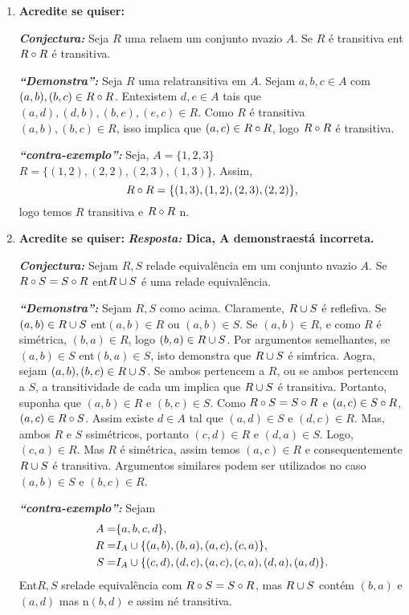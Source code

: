 \begin{enumerate}[{\bf 1.}]
\item {\bf Acredite se quiser:}  

\noindent \textit{\textbf{Conjectura:}} Seja $R$ uma rela\cao em um conjunto n\ao vazio $A$. Se $R$ \'e transitiva ent\ao $R\circ R$ \'e transitiva.

\noindent \textit{\textbf{``Demonstra\caoi'':}} Seja $R$ uma rela\cao transitiva em $A$. Sejam $a,b,c\in A$ com $(a,b),(b,c)\in R\circ R$. Ent\ao existem $d,e\in A$ tais que $(a,d),(d,b),(b,e),(e,c)\in R$. Como $R$ \'e transitiva $(a,b),(b,c)\in R$, isso implica que $(a,c)\in R\circ R$, logo $R\circ R$ \'e transitiva.

\noindent \textit{\textbf{``contra-exemplo'':}} Seja, $A=\{1,2,3\}$ $R=\{(1,2),(2,2),(2,3),(1,3)\}$. Assim,
\[
R\circ R=\{(1,3),(1,2),(2,3),(2,2)\},
\]
logo temos $R$ transitiva e $R\circ R$ n\aoi.

\item {\bf Acredite se quiser:} {\bf{\it Resposta:} Dica, A demonstra\cao est\'a incorreta.} 

\noindent \textit{\textbf{Conjectura:}} Sejam $R,S$ rela\coes de equival\^encia em um conjunto n\ao vazio $A$. Se $R\circ S=S\circ R$ ent\ao $R\cup S$ \'e uma rela\cao de equival\^encia.

\noindent \textit{\textbf{``Demonstra\caoi'':}} Sejam $R,S$ como acima. Claramente, $R\cup S$ \'e reflefiva. Se $(a,b)\in R\cup S$ ent\ao $(a,b)\in R$ ou $(a,b)\in S$. Se $(a,b)\in R$, e como $R$ \'e sim\'etrica, $(b,a)\in R$, logo $(b,a)\in R\cup S$. Por argumentos semelhantes, se $(a,b)\in S$ ent\ao $(b,a)\in S$, isto demonstra que $R\cup S$ \'e sim\'trica. Aogra, sejam $(a,b),(b,c)\in R\cup S$. Se ambos pertencem a $R$, ou se ambos pertencem a $S$, a transitividade de cada um implica que $R\cup S$ \'e transitiva. Portanto, suponha que $(a,b)\in R$ e $(b,c)\in S$. Como $R\circ S=S\circ R$ e $(a,c)\in S\circ R$, $(a,c)\in R\circ S$. Assim existe $d\in A$ tal que $(a,d)\in S$ e $(d,c)\in R$. Mas, ambos $R$ e $S$ s\ao sim\'etricos, portanto $(c,d)\in R$ e $(d,a)\in S$. Logo, $(c,a)\in R$. Mas $R$ \'e sim\'etrica, assim temos $(a,c)\in R$ e consequentemente $R\cup S$ \'e transitiva. Argumentos similares podem ser utilizados no caso $(a,b)\in S$ e $(b,c)\in R$.

\noindent \textit{\textbf{``contra-exemplo'':}} Sejam 
\begin{equation*}
 \begin{aligned}
A=&\{a,b,c,d\},\\
R=&I_A\cup\{(a,b),(b,a),(a,c),(c,a)\},\\
S=&I_A\cup\{(c,d),(d,c),(a,c),(c,a),(d,a),(a,d)\}.
 \end{aligned}
\end{equation*}
Ent\ao $R,S$ s\ao rela\coes de equival\^encia com $R\circ S=S\circ R$, mas $R\cup S$ cont\'em $(b,a)$ e $(a,d)$ mas n\ao $(b,d)$ e assim n\ao \'e transitiva.


\end{enumerate}
